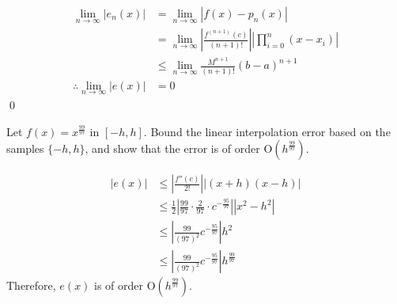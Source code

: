 \documentclass[fleqn, a4paper, 11pt, oneside]{amsart}
\theoremstyle{definition}
\theoremstyle{theorem}
\begin{document}
\begin{solution}
	\begin{align*}
		\lim\limits_{n \to \infty} \left| e_n(x) \right|          & = \lim\limits_{n \to \infty} \left| f(x) - p_n(x) \right|                                                                     \\
                                                                          & = \lim\limits_{n \to \infty} \left| \frac{f^{(n + 1)}(c)}{(n + 1)!} \right| \left| \prod\limits_{i = 0}^{n} (x - x_i) \right| \\
                                                                          & \le \lim\limits_{n \to \infty} \frac{M^{n + 1}}{(n + 1)!} (b - a)^{n + 1}                                                     \\
		\therefore \lim\limits_{n \to \infty} \left| e(x) \right| & = 0
	\end{align*}
	\qed
\end{solution}

\begin{question}
	Let $f(x) = x^{\frac{99}{97}}$ in $[-h,h]$.
	Bound the linear interpolation error based on the samples $\{-h,h\}$, and show that the error is of order $\mathrm{O}\left( h^{\frac{99}{97}} \right)$.
\end{question}

\begin{solution}
	\begin{align*}
		\left| e(x) \right| & \le \left| \frac{f''(c)}{2!} \right| \left| (x + h) (x - h) \right|                                               \\
                                    & \le \frac{1}{2} \left| \frac{99}{97} \cdot \frac{2}{97} \cdot c^{-\frac{95}{97}} \right| \left| x^2 - h^2 \right| \\
                                    & \le \left| \frac{99}{(97)^2} c^{-\frac{95}{97}} \right| h^2                                                       \\
                                    & \le \left| \frac{99}{(97)^2} c^{-\frac{95}{97}} \right| h^{\frac{99}{97}}
	\end{align*}
	Therefore, $e(x)$ is of order $\mathrm{O}\left( h^{\frac{99}{97}} \right)$.
\end{solution}
\end{document}
